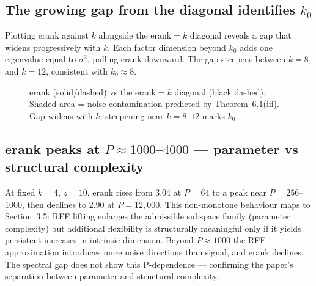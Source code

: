 \documentclass[11pt,a4paper]{article}
\begin{document}
\subsection*{The growing gap from the diagonal identifies $k_0$}

Plotting erank against $k$ alongside the $\mathrm{erank}=k$ diagonal reveals a gap
that widens progressively with $k$. Each factor dimension beyond $k_0$ adds one
eigenvalue equal to $\sigma^2$, pulling erank downward. The gap steepens between
$k=8$ and $k=12$, consistent with $k_0\approx 8$.

\begin{figure}[h]
\centering
{}
\caption{erank (solid/dashed) vs the erank$=k$ diagonal (black dashed). Shaded area =
noise contamination predicted by Theorem~6.1(iii). Gap widens with $k$;
steepening near $k=8$--$12$ marks $k_0$.}
\end{figure}

\subsection*{erank peaks at $P\approx 1000$--$4000$ — parameter vs structural complexity}

At fixed $k=4$, $z=10$, erank rises from 3.04 at $P=64$ to a peak near $P=256$--$1000$,
then declines to 2.90 at $P=12{,}000$. This non-monotone behaviour maps to Section~3.5:
RFF lifting enlarges the admissible subspace family (parameter complexity) but
additional flexibility is structurally meaningful only if it yields persistent
increases in intrinsic dimension. Beyond $P\approx 1000$ the RFF approximation
introduces more noise directions than signal, and erank declines.
The spectral gap does not show this P-dependence — confirming the paper's
separation between parameter and structural complexity.
\end{document}
